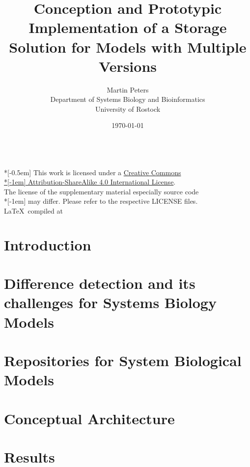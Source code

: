 \documentclass[12pt, a4paper, titlepage]{book}
\title{Conception and Prototypic Implementation of a Storage Solution for Models with Multiple Versions}
\author{Martin Peters\\[12pt]
	\small Department of Systems Biology and Bioinformatics\\
	\small University of Rostock}
\date{\today}
\begin{document}
	\maketitle
	\pagebreak
	~ \vfill
	{
		\tiny \noindent
		{\normalsize \href{http://creativecommons.org/licenses/by-sa/4.0/}{\ccbysa}} \\*[-0.5em]
		This work is licensed under a \href{http://creativecommons.org/licenses/by-sa/4.0/}{Creative Commons\\*[-1em] Attribution-ShareAlike 4.0 International License}. \\
		The license of the supplementary material especially source code\\*[-1em]
		may differ. Please refer to the respective LICENSE files.\\
		\LaTeX ~compiled at \DTMnow
	}
	\pagebreak
	\tableofcontents
	\listoffigures
	
	
	\chapter{Introduction}
	
	
	\chapter{Difference detection and its challenges for Systems Biology Models}
	
	
	\chapter{Repositories for System Biological Models}
	
	
	\chapter{Conceptual Architecture}
	
	
	\chapter{Results}
	
	
\end{document}
